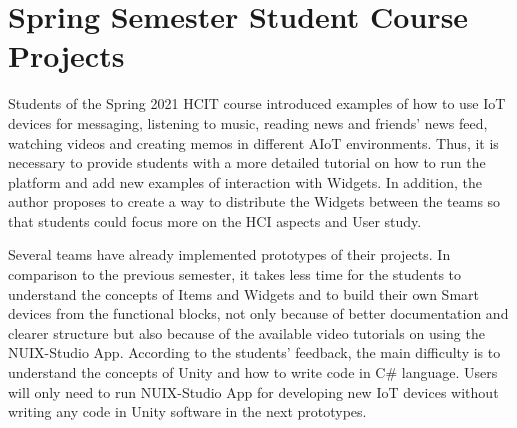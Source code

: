 \section{Spring Semester Student Course Projects}

Students of the Spring 2021 HCIT course introduced examples of how to use IoT devices for messaging, listening to music, reading news and friends' news feed, watching videos and creating memos in different AIoT environments. Thus, it is necessary to provide students with a more detailed tutorial on how to run the platform and add new examples of interaction with Widgets. In addition, the author proposes to create a way to distribute the  Widgets between the teams so that students could focus more on the HCI aspects and User study. 

Several teams have already implemented prototypes of their projects. In comparison to the previous semester, it takes less time for the students to understand the concepts of Items and Widgets and to build their own Smart devices from the functional blocks, not only because of better documentation and clearer structure but also because of the available video tutorials on using the NUIX-Studio App. According to the students' feedback, the main difficulty is to understand the concepts of Unity and how to write code in C\# language. Users will only need to run NUIX-Studio App for developing new IoT devices without writing any code in Unity software in the next prototypes.